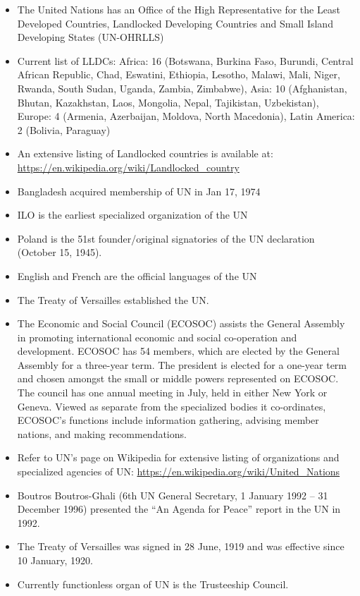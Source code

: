 \documentclass[
  openany]{book}
\begin{document}
\begin{itemize}
\item
  The United Nations has an Office of the High Representative for the Least Developed Countries, Landlocked Developing Countries and Small Island Developing States (UN-OHRLLS)
\item
  Current list of LLDCs: Africa: 16 (Botswana, Burkina Faso, Burundi, Central African Republic, Chad, Eswatini, Ethiopia, Lesotho, Malawi, Mali, Niger, Rwanda, South Sudan, Uganda, Zambia, Zimbabwe), Asia: 10 (Afghanistan, Bhutan, Kazakhstan, Laos, Mongolia, Nepal, Tajikistan, Uzbekistan), Europe: 4 (Armenia, Azerbaijan, Moldova, North Macedonia), Latin America: 2 (Bolivia, Paraguay)
\item
  An extensive listing of Landlocked countries is available at: \url{https://en.wikipedia.org/wiki/Landlocked_country}
\item
  Bangladesh acquired membership of UN in Jan 17, 1974
\item
  ILO is the earliest specialized organization of the UN
\item
  Poland is the 51st founder/original signatories of the UN declaration (October 15, 1945).
\item
  English and French are the official languages of the UN
\item
  The Treaty of Versailles established the UN.
\item
  The Economic and Social Council (ECOSOC) assists the General Assembly in promoting international economic and social co-operation and development. ECOSOC has 54 members, which are elected by the General Assembly for a three-year term. The president is elected for a one-year term and chosen amongst the small or middle powers represented on ECOSOC. The council has one annual meeting in July, held in either New York or Geneva. Viewed as separate from the specialized bodies it co-ordinates, ECOSOC's functions include information gathering, advising member nations, and making recommendations.
\item
  Refer to UN's page on Wikipedia for extensive listing of organizations and specialized agencies of UN: \url{https://en.wikipedia.org/wiki/United_Nations}
\item
  Boutros Boutros-Ghali (6th UN General Secretary, 1 January 1992 -- 31 December 1996) presented the ``An Agenda for Peace'' report in the UN in 1992.
\item
  The Treaty of Versailles was signed in 28 June, 1919 and was effective since 10 January, 1920.
\item
  Currently functionless organ of UN is the Trusteeship Council.

\end{itemize}
\end{document}
